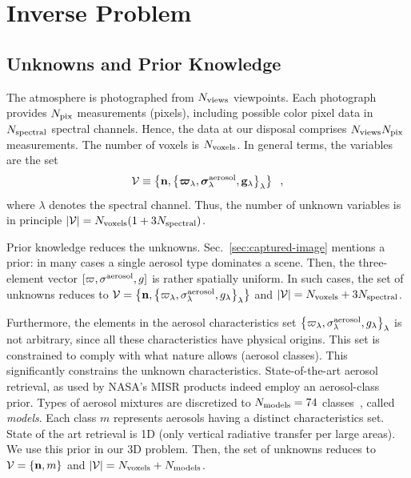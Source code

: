 \documentclass[10pt,twocolumn,letterpaper]{article}
\newcommand{\vect}[1]{\bm{#1}}
\begin{document}
\section{Inverse Problem}
\label{sec:inverse-problem}

\subsection{Unknowns and Prior Knowledge}
\label{sec:prior}

The atmosphere is photographed from $N_{\rm views}$ viewpoints. Each photograph provides
$N_{\rm pix}$ measurements (pixels), including possible color pixel data in $N_{\rm spectral}$ spectral channels. Hence, the data at our disposal comprises $N_{\rm views}N_{\rm pix}$ measurements.
The number of voxels is  $N_{\rm voxels}$.  In general terms, the variables are the set
\begin{equation}
 {\cal V}\equiv
  \left\{
    {\bf n},
     \left\{
       \vect{\varpi}_{\lambda},\vect{\sigma}^{\rm aerosol}_{\lambda},{\bf g}_{\lambda}
      \right\}_{\lambda}
   \right\}
  \;\;,
  \label{eq:calV}
\end{equation}
where $\lambda$ denotes the spectral channel. Thus, the number of unknown variables is in principle \mbox{$|{\cal V}|=N_{\rm voxels}(1+3N_{\rm spectral})$}.


Prior knowledge reduces the unknowns. Sec.~\ref{sec:captured-image} mentions a prior:
in many cases a single aerosol type dominates a scene. Then, the three-element
vector $[\varpi,{\sigma}^{\rm aerosol},g]$ is rather spatially uniform. In such cases, the set of unknowns
reduces to
$ {\cal V}=
  \left\{
    {\bf n},
     \left\{
       {\varpi}_{\lambda},{\sigma}^{\rm aerosol}_{\lambda},g_{\lambda}
      \right\}_{\lambda}
   \right\}
$
and \mbox{$|{\cal V}|=N_{\rm voxels}+3N_{\rm spectral}$}.

Furthermore, the elements in the aerosol characteristics
set $\left\{
       {\varpi}_{\lambda},{\sigma}^{\rm aerosol}_{\lambda},g_{\lambda}
      \right\}_{\lambda}$
is not arbitrary, since all these characteristics have physical origins. This
set is constrained to comply with what nature allows (aerosol classes).
This significantly constrains the unknown characteristics. State-of-the-art aerosol retrieval,
as used by NASA's MISR products indeed employ an aerosol-class prior. Types of aerosol mixtures are discretized to $N_{\rm models}=74$ classes~\cite{martonchikBook}, called {\em models}.
Each class $m$ represents aerosols having a distinct characteristics set.
State of the art retrieval is 1D (only vertical radiative transfer per large areas). We use
this prior in our 3D problem. Then, the set of unknowns reduces to
$ {\cal V}= \left\{ {\bf n},m  \right\}$
and \mbox{$|{\cal V}|=N_{\rm voxels}+N_{\rm models}$}.
\end{document}
